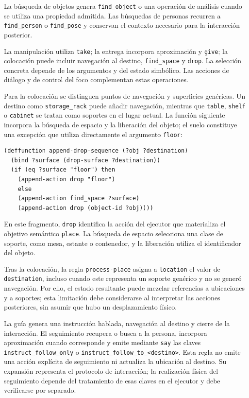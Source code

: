 La búsqueda de objetos genera \texttt{find\_object} o una
operación de análisis cuando se utiliza una propiedad admitida. Las
búsquedas de personas recurren a \texttt{find\_person} o
\texttt{find\_pose} y conservan el contexto necesario para la
interacción posterior.

La manipulación utiliza \texttt{take};
la entrega incorpora aproximación y \texttt{give}; la colocación puede
incluir navegación al destino, \texttt{find\_space} y \texttt{drop}.
La selección concreta depende de los argumentos y del estado simbólico.
Las acciones de diálogo y de control del foco complementan estas
operaciones.

Para la colocación se distinguen puntos de navegación y superficies
genéricas. Un destino como \texttt{storage\_rack} puede añadir navegación,
mientras que \texttt{table}, \texttt{shelf} o \texttt{cabinet} se tratan
como soportes en el lugar actual. La función siguiente incorpora la
búsqueda de espacio y la liberación del objeto; el suelo constituye una
excepción que utiliza directamente el argumento \texttt{floor}:

{\small
\begin{verbatim}
(deffunction append-drop-sequence (?obj ?destination)
  (bind ?surface (drop-surface ?destination))
  (if (eq ?surface "floor") then
    (append-action drop "floor")
    else
    (append-action find_space ?surface)
    (append-action drop (object-id ?obj))))
\end{verbatim}
}

En este fragmento, \texttt{drop} identifica la acción del ejecutor que
materializa el objetivo semántico \texttt{place}. La búsqueda de espacio
selecciona una clase de soporte, como mesa, estante o contenedor, y la
liberación utiliza el identificador del objeto.

Tras la colocación, la regla \texttt{process-place} asigna a
\texttt{location} el valor de \texttt{destination}, incluso cuando
este representa un soporte genérico y no se generó navegación.
Por ello, el estado resultante puede mezclar referencias a ubicaciones
y a soportes; esta limitación debe considerarse al interpretar las
acciones posteriores, sin asumir que hubo un desplazamiento físico.

La guía genera una instrucción hablada, navegación al destino y cierre
de la interacción. El seguimiento recupera o busca a la persona,
incorpora aproximación cuando corresponde y emite mediante \texttt{say}
las claves \texttt{instruct\_\allowbreak follow\_\allowbreak only} o
\texttt{instruct\_\allowbreak follow\_\allowbreak to\_\allowbreak <destino>}. Esta regla no emite una
acción explícita de seguimiento ni actualiza la ubicación al destino.
Su expansión representa el protocolo de interacción; la realización
física del seguimiento depende del tratamiento de esas claves en el
ejecutor y debe verificarse por separado.

